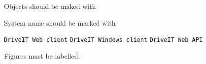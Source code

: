 
Objects should be maked with \texttt{}

System name should be marked with \texttt{}

\texttt{DriveIT Web client}
\texttt{DriveIT Windows client}
\texttt{DriveIT Web API}

Figures must be labelled.